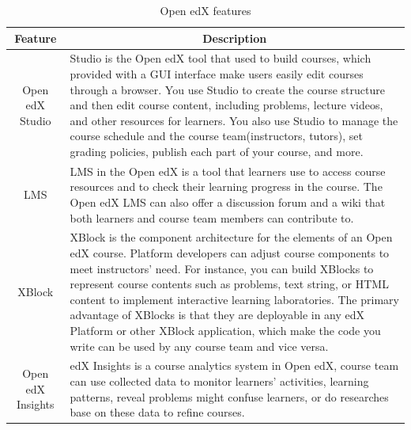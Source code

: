\begin{table}[H]
\centering
\caption{Open edX features}
\label{table:edxfeature}
\begin{tabular}{|c|p{12cm}|}
\hline
Feature           & \multicolumn{1}{c|}{Description}                                                                                                                                                                                                                                                                                                                                                                                                                                                                                    \\ \hline
Open edX Studio   & Studio is the Open edX tool that used to build courses, which provided with a GUI interface make users easily edit courses through a browser. You use Studio to create the course structure and then edit course content, including problems, lecture videos, and other resources for learners. You also use Studio to manage the course schedule and the course team(instructors, tutors), set grading policies, publish each part of your course, and more.                                                       \\ \hline
LMS               & LMS in the Open edX is a tool that learners use to access course resources and to check their learning progress in the course. The Open edX LMS can also offer a discussion forum and a wiki that both learners and course team members can contribute to.                                                                                                                                                                                                                                                          \\ \hline
XBlock            & XBlock is the component architecture for the elements of an Open edX course. Platform developers can adjust course components to meet instructors' need. For instance, you can build XBlocks to represent course contents such as problems, text string, or HTML content to implement interactive learning laboratories. The primary advantage of XBlocks is that they are deployable in any edX Platform or other XBlock application, which make the code you write can be used by any course team and vice versa. \\ \hline
Open edX Insights & edX Insights is a course analytics system in Open edX, course team can use collected data to monitor learners' activities, learning patterns, reveal problems might confuse learners, or do researches base on these data to refine courses.                                                                                                                                                                                                                                                                        \\ \hline
\end{tabular}
\end{table}

